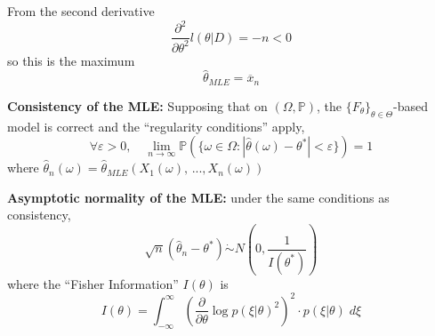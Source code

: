 \documentclass[12pt]{article}
\renewcommand{\hat}[1]{\widehat{#1}}
\renewcommand{\P}{\mathbb{P}}
\begin{document}
From the second derivative 
\[\frac{\partial^2}{\partial \theta^2} l(\theta| D) = -n < 0\]
so this is the maximum 
\[\hat \theta_{MLE} = \overline x_n\]

\textbf{Consistency of the MLE:} Supposing that on $(\Omega, \P)$, the $\{F_\theta\}_{\theta \in \Theta}$-based model is correct and the ``regularity conditions'' apply, 
\[\forall \varepsilon > 0, \quad \lim_{n\to \infty} \P(\{\omega\in \Omega: |\hat \theta(\omega) - \theta^*| < \varepsilon\}) = 1 \]
where $\hat \theta_n(\omega) = \hat \theta_{MLE}(X_1(\omega), \, ..., X_n(\omega))$

\textbf{Asymptotic normality of the MLE:} under the same conditions as consistency, 
\[\sqrt{n} (\hat \theta_n - \theta^*) \dot \sim N(0, \frac{1}{I(\theta^*)})\]
where the ``Fisher Information'' $I(\theta)$ is 
\[I(\theta) = \int_{-\infty}^{\infty} \left(\frac{\partial}{\partial \theta} \log p(\xi | \theta)^2\right)^2 \cdot p(\xi | \theta)\; d\xi\]
\end{document}
